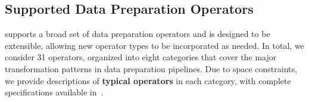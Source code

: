 

\subsection{Supported Data Preparation Operators}
\label{subsec:operator_space}
\sys supports a broad set of data preparation operators and is designed to be extensible, allowing new operator types to be incorporated as needed. In total, we consider 31 operators, organized into eight categories that cover the major transformation patterns in data preparation pipelines.
Due to space constraints, we provide descriptions of \textbf{typical operators} in each category, with complete specifications available in~\cite{technical_report}.

% 

%


